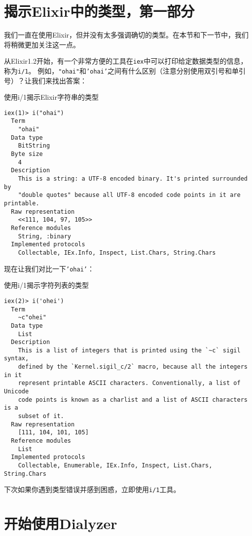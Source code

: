 \section{揭示Elixir中的类型，第一部分}

我们一直在使用Elixir，但并没有太多强调确切的类型。在本节和下一节中，我们将稍微更加关注这一点。

从Elixir1.2开始，有一个非常方便的工具在\texttt{iex}中可以打印给定数据类型的信息，称为\texttt{i/1}。
例如，\texttt{"ohai"}和\texttt{'ohai'}之间有什么区别（注意分别使用双引号和单引号）？让我们来找出答案：

\begin{code}{使用i/1揭示Elixir字符串的类型}
\begin{verbatim}
iex(1)> i("ohai")
  Term
    "ohai"
  Data type
    BitString
  Byte size
    4
  Description
    This is a string: a UTF-8 encoded binary. It's printed surrounded by
    "double quotes" because all UTF-8 encoded code points in it are printable.
  Raw representation
    <<111, 104, 97, 105>>
  Reference modules
    String, :binary
  Implemented protocols
    Collectable, IEx.Info, Inspect, List.Chars, String.Chars
\end{verbatim}
\end{code}

现在让我们对比一下\texttt{'ohai'}：

\begin{code}{使用i/1揭示字符列表的类型}

\begin{verbatim}
iex(2)> i('ohei')
  Term
    ~c"ohei"
  Data type
    List
  Description
    This is a list of integers that is printed using the `~c` sigil syntax,
    defined by the `Kernel.sigil_c/2` macro, because all the integers in it
    represent printable ASCII characters. Conventionally, a list of Unicode
    code points is known as a charlist and a list of ASCII characters is a
    subset of it.
  Raw representation
    [111, 104, 101, 105]
  Reference modules
    List
  Implemented protocols
    Collectable, Enumerable, IEx.Info, Inspect, List.Chars, String.Chars
\end{verbatim}
\end{code}

下次如果你遇到类型错误并感到困惑，立即使用\texttt{i/1}工具。

\section{开始使用Dialyzer}

